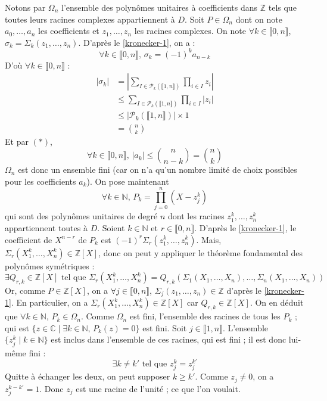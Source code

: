 	\begin{demonstration}
		Notons par $\Omega_n$ l'ensemble des polynômes unitaires à coefficients dans $\mathbb{Z}$ tels que toutes leurs racines complexes appartiennent à $D$. Soit $P \in \Omega_n$ dont on note $a_0, \dots, a_n$ les coefficients et $z_1, \dots, z_n$ les racines complexes. On note $\forall k \in \llbracket 0, n \rrbracket$, $\sigma_k = \Sigma_k(z_1, \dots, z_n)$. D'après le \cref{kronecker-1}, on a :
		\[ \forall k \in \llbracket 0, n \rrbracket, \, \sigma_k = (-1)^k a_{n-k} \tag{$*$} \]
		D'où $\forall k \in \llbracket 0, n \rrbracket$ :
		\begin{align*}
			|\sigma_k| &= \left| \sum_{I \in \mathcal{P}_k(\llbracket 1, n \rrbracket)} \prod_{i \in I} z_i \right| \\
			&\leq \sum_{I \in \mathcal{P}_k(\llbracket 1, n \rrbracket)} \prod_{i \in I} |z_i| \\
			&\leq |\mathcal{P}_k(\llbracket 1, n \rrbracket)| \times 1 \\
			&= \binom{n}{k}
		\end{align*}
		Et par $(*)$,
		\[ \forall k \in \llbracket 0, n \rrbracket, \, |a_k| \leq \binom{n}{n-k} = \binom{n}{k} \]
		$\Omega_n$ est donc un ensemble fini (car on n'a qu'un nombre limité de choix possibles pour les coefficients $a_k$).
		\newpar
		On pose maintenant
		\[ \forall k \in \mathbb{N}, \, P_k = \prod_{j=0}^n (X-z_j^k) \]
		qui sont des polynômes unitaires de degré $n$ dont les racines $z_1^k, \dots, z_n^k$ appartiennent toutes à $D$. Soient $k \in \mathbb{N}$ et $r \in \llbracket 0, n \rrbracket$. D'après le \cref{kronecker-1}, le coefficient de $X^{n-r}$ de $P_k$ est $(-1)^r \Sigma_r(z_1^k, \dots, z_n^k)$. Mais, $\Sigma_r(X_1^k, \dots, X_n^k) \in \mathbb{Z}[X]$, donc on peut y appliquer le théorème fondamental des polynômes symétriques :
		\[ \exists Q_{r,k} \in \mathbb{Z}[X] \text{ tel que } \Sigma_r(X_1^k, \dots, X_n^k) = Q_{r,k}(\Sigma_1(X_1, \dots, X_n), \dots, \Sigma_n(X_1, \dots, X_n)) \]
		Or, comme $P \in \mathbb{Z}[X]$, on a $\forall j \in \llbracket 0, n \rrbracket$, $\Sigma_j(z_1, \dots, z_n) \in \mathbb{Z}$ d'après le \cref{kronecker-1}. En particulier, on a $\Sigma_r(X_1^k, \dots, X_n^k) \in \mathbb{Z}[X]$ car $Q_{r,k} \in \mathbb{Z}[X]$. On en déduit que $\forall k \in \mathbb{N}$, $P_k \in \Omega_n$.
		\newpar
		Comme $\Omega_n$ est fini, l'ensemble des racines de tous les $P_k$ ; qui est $\{ z \in \mathbb{C} \mid \exists k \in \mathbb{N}, \, P_k(z) = 0 \}$ est fini. Soit $j \in \llbracket 1, n \rrbracket$. L'ensemble $\{ z_j^k \mid k \in \mathbb{N} \}$ est inclus dans l'ensemble de ces racines, qui est fini ; il est donc lui-même fini :
		\[ \exists k \neq k' \text{ tel que } z_j^k = z_j^{k'} \]
		Quitte à échanger les deux, on peut supposer $k \geq k'$. Comme $z_j \neq 0$, on a $z_j^{k-k'} = 1$. Donc $z_j$ est une racine de l'unité ; ce que l'on voulait.
	\end{demonstration}


